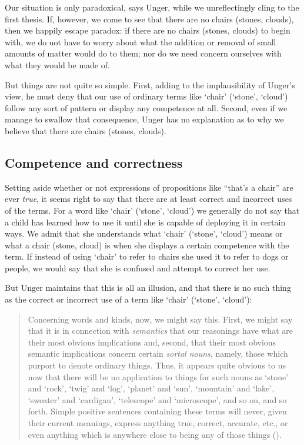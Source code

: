 \documentclass[11pt]{standalone} \newif\ifstandlone \standalonetrue
\newenvironment{squote}{%
	\begin{quote}\begin{singlespace}%
	}{%
	\end{singlespace}\end{quote}}
\begin{document}
\begin{spacing}{1.5}
Our situation is only paradoxical, says Unger, while we unreflectingly
cling to the first thesis.  If, however, we come to see that there are
no chairs (stones, clouds), then we happily escape paradox: if there
are no chairs (stones, clouds) to begin with, we do not have to worry
about what the addition or removal of small amounts of matter would do
to them; nor do we need concern ourselves with what they would be made
of.

But things are not quite so simple.  First, adding to the
implausibility of Unger's view, he must deny that our use of ordinary
terms like `chair' (`stone', `cloud') follow any sort of pattern or
display any competence at all.  Second, even if we manage to swallow
that consequence, Unger has no explanation as to why we believe that
there are chairs (stones, clouds).

\subsection{Competence and correctness}
\label{comp}
Setting aside whether or not expressions of propositions like ``that's
a chair'' are ever \emph{true}, it seems right to say that there are
at least correct and incorrect uses of the terms.  For a word like
`chair' (`stone', `cloud') we generally do not say that a child has
learned how to use it until she is capable of deploying it in certain
ways.  We admit that she understands what `chair' (`stone', `cloud')
means or what a chair (stone, cloud) is when she displays a certain
competence with the term.  If instead of using `chair' to refer to
chairs she used it to refer to dogs or people, we would say that she
is confused and attempt to correct her use.

But Unger maintains that this is all an illusion, and that there is no
such thing as the correct or incorrect use of a term like `chair'
(`stone', `cloud'):

\begin{squote}
Concerning words and kinds, now, we might say this.  First, we might
say that it is in connection with \emph{semantics} that our reasonings have
what are their most obvious implications and, second, that their most
obvious semantic implications concern certain \emph{sortal nouns}, namely,
those which purport to denote ordinary things.  Thus, it appears quite
obvious to us now that there will be no application to things for such
nouns as `stone' and `rock', `twig' and `log', `planet' and `sun',
`mountain' and `lake', `sweater' and `cardigan', `telescope' and
`microscope', and so on, and so forth.  Simple positive sentences
containing these terms will never, given their current meanings,
express anything true, correct, accurate, etc., or even anything which
is anywhere close to being any of those things
(\citeyear[148]{unger1979}).
\end{squote}


\end{spacing}
\end{document}
